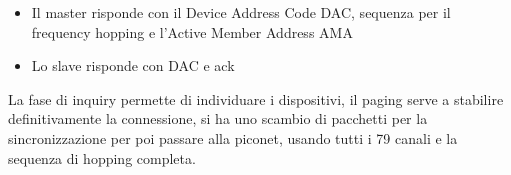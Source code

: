\begin{questions}
\begin{solution}
\begin{itemize}
            \item Il master risponde con il Device Address Code DAC, sequenza per il frequency hopping e l'Active Member Address AMA
            
            \item Lo slave risponde con DAC e ack
        \end{itemize}
        
        La fase di inquiry permette di individuare i dispositivi, il paging serve a stabilire definitivamente la connessione, si ha uno scambio di pacchetti per la sincronizzazione per poi passare alla piconet, usando tutti i 79 canali e la sequenza di hopping completa.
    \end{solution}
\end{questions}